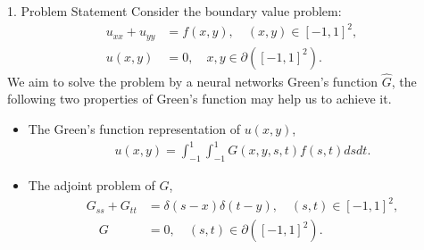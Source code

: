 \begin{frame}{1. Problem Statement}
Consider the boundary value problem:
\begin{align}
  u_{xx} + u_{yy}  &= f(x, y), \quad (x,y)\in[-1,1]^2, \\
  u(x, y)&=0, \quad x, y\in \partial ([-1,1]^2).
\end{align}
We aim to solve the problem by a neural networks Green's function $\hat{G}$,
 the following two properties of Green's function may help us to achieve it.
\begin{itemize}
  \item[1.] The Green’s function representation of $u(x, y)$,
  \begin{align}
    u(x,y) = \int_{-1}^{1}\int_{-1}^{1}G(x,y,s,t)f(s,t)dsdt.
  \end{align}
  \item[2.] The adjoint problem of $G$,
  \begin{align}
    G_{ss}+G_{tt}&=\delta(s-x)\delta(t-y), \quad (s,t)\in[-1,1]^2, \\
    \quad G&=0, \quad (s,t)\in \partial ([-1,1]^2).
  \end{align}
\end{itemize}
\end{frame}